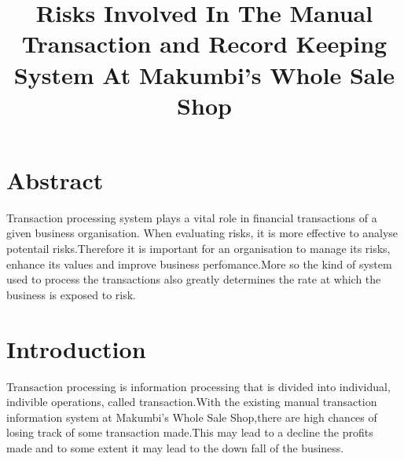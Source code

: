 \documentclass[12pt]{article}
\title{Risks Involved In The Manual Transaction and Record Keeping System At Makumbi's Whole Sale Shop}
\begin{document}
\maketitle
\section{Abstract}
Transaction processing system plays a vital role in financial transactions of a given business organisation. When evaluating risks, it is more effective to analyse potentail risks.Therefore it is important for an organisation to manage its risks, enhance its values and improve business perfomance.More so the kind of system used to process the transactions also greatly determines the rate at which the business is exposed to risk. 
\section{Introduction}
Transaction processing is information processing that is divided into individual, indivible operations, called transaction.With the existing manual transaction information system at Makumbi's Whole Sale Shop,there are high chances of losing track of some transaction made.This may lead to a decline the profits made and to some extent it may lead to the down fall of the business. \\
\end{document}
